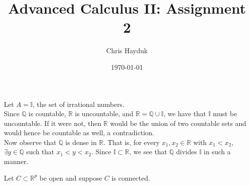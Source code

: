 \documentclass[12pt]{article}
\newenvironment{problem}[2][Problem]{\begin{trivlist}
\item[\hskip \labelsep {\bfseries #1}\hskip \labelsep {\bfseries #2.}]}{\end{trivlist}}
\begin{document}
\title{Advanced Calculus II: Assignment 2}

\author{Chris Hayduk}
\date{\today}

\maketitle

\begin{problem}{1}
\end{problem}

\begin{problem}{2}
\end{problem}

Let $A = \mathbb{I}$, the set of irrational numbers.\\

Since $\mathbb{Q}$ is countable, $\mathbb{R}$ is uncountable, and $\mathbb{R} = \mathbb{Q} \cup \mathbb{I}$, we have that $\mathbb{I}$ must be uncountable. If it were not, then $\mathbb{R}$ would be the union of two countable sets and would hence be countable as well, a contradiction.\\

Now observe that $\mathbb{Q}$ is dense in $\mathbb{R}$. That is, for every $x_1, x_2 \in \mathbb{R}$ with $x_1 < x_2$, $\exists y \in \mathbb{Q}$ such that $x_1 < y < x_2$. Since $\mathbb{I} \subset \mathbb{R}$, we see that $\mathbb{Q}$ divides $\mathbb{I}$ in such a manner.\\

\begin{problem}{3}
\end{problem}

Let $C \subset \mathbb{R}^p$ be open and suppose $C$ is connected.
\end{document}
